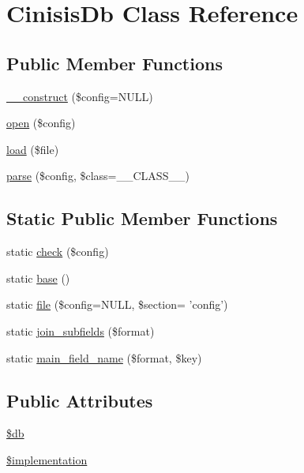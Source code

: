 \hypertarget{classCinisisDb}{
\section{CinisisDb Class Reference}
\label{classCinisisDb}
}
\subsection*{Public Member Functions}
\begin{DoxyCompactItemize}
\item 
\hyperlink{classCinisisDb_a0693dfb4a5bb8b039f3c7e7848dc1861}{\_\-\_\-construct} (\$config=NULL)
\item 
\hyperlink{classCinisisDb_ab6fe06865770b4ade264116627cab487}{open} (\$config)
\item 
\hyperlink{classCinisisDb_a517ae044290df8ccea6b04ad91d19a7f}{load} (\$file)
\item 
\hyperlink{classCinisisDb_a5b0ec2897d714c79c673d5950dde8e14}{parse} (\$config, \$class=\_\-\_\-CLASS\_\-\_\-)
\end{DoxyCompactItemize}
\subsection*{Static Public Member Functions}
\begin{DoxyCompactItemize}
\item 
static \hyperlink{classCinisisDb_ad1691843692ee6e9461e5bcb692263c8}{check} (\$config)
\item 
static \hyperlink{classCinisisDb_ab44fe0ebdf6a954bc02d50bc7bcc3464}{base} ()
\item 
static \hyperlink{classCinisisDb_ac44f1e510c52d21090aab8b903c6ddf5}{file} (\$config=NULL, \$section= 'config')
\item 
static \hyperlink{classCinisisDb_a18c5fa49b8683ed0e80cdf72d360d50a}{join\_\-subfields} (\$format)
\item 
static \hyperlink{classCinisisDb_a5f0fe8ae1b21721f759bde7fc260a283}{main\_\-field\_\-name} (\$format, \$key)
\end{DoxyCompactItemize}
\subsection*{Public Attributes}
\begin{DoxyCompactItemize}
\item 
\hyperlink{classCinisisDb_af5032dd536f8b50a71871dd35c8be175}{\$db}
\item 
\hyperlink{classCinisisDb_af236be4b737a41fff5e97cf4471f1c00}{\$implementation}
\end{DoxyCompactItemize}


